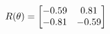 \documentclass[preview]{standalone}
\begin{document}
\begin{align*}
\special{dvisvgm:raw <g id='unique000'>}R(\theta) = \begin{bmatrix}-0.59 & 0.81\\-0.81 & -0.59\end{bmatrix}\special{dvisvgm:raw </g>}
\end{align*}
\end{document}
